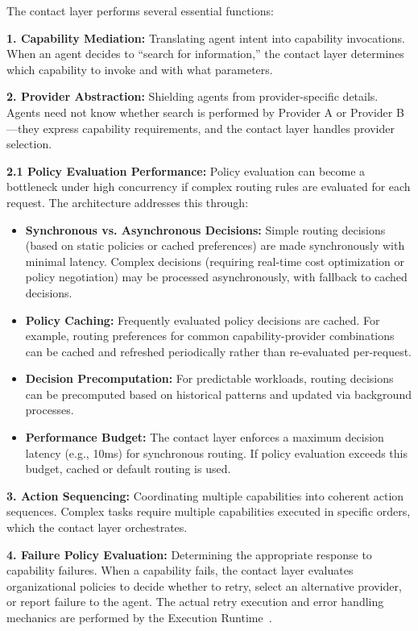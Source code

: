 The contact layer performs several essential functions:

\textbf{1. Capability Mediation:} Translating agent intent into capability invocations. When an agent decides to ``search for information,'' the contact layer determines which capability to invoke and with what parameters.

\textbf{2. Provider Abstraction:} Shielding agents from provider-specific details. Agents need not know whether search is performed by Provider A or Provider B---they express capability requirements, and the contact layer handles provider selection.

\textbf{2.1 Policy Evaluation Performance:} Policy evaluation can become a bottleneck under high concurrency if complex routing rules are evaluated for each request. The architecture addresses this through:
\begin{itemize}[leftmargin=*]
\item \textbf{Synchronous vs. Asynchronous Decisions:} Simple routing decisions (based on static policies or cached preferences) are made synchronously with minimal latency. Complex decisions (requiring real-time cost optimization or policy negotiation) may be processed asynchronously, with fallback to cached decisions.
\item \textbf{Policy Caching:} Frequently evaluated policy decisions are cached. For example, routing preferences for common capability-provider combinations can be cached and refreshed periodically rather than re-evaluated per-request.
\item \textbf{Decision Precomputation:} For predictable workloads, routing decisions can be precomputed based on historical patterns and updated via background processes.
\item \textbf{Performance Budget:} The contact layer enforces a maximum decision latency (e.g., 10ms) for synchronous routing. If policy evaluation exceeds this budget, cached or default routing is used.
\end{itemize}

\textbf{3. Action Sequencing:} Coordinating multiple capabilities into coherent action sequences. Complex tasks require multiple capabilities executed in specific orders, which the contact layer orchestrates.

\textbf{4. Failure Policy Evaluation:} Determining the appropriate response to capability failures. When a capability fails, the contact layer evaluates organizational policies to decide whether to retry, select an alternative provider, or report failure to the agent. The actual retry execution and error handling mechanics are performed by the Execution Runtime~\cite{wang2026execution}.

